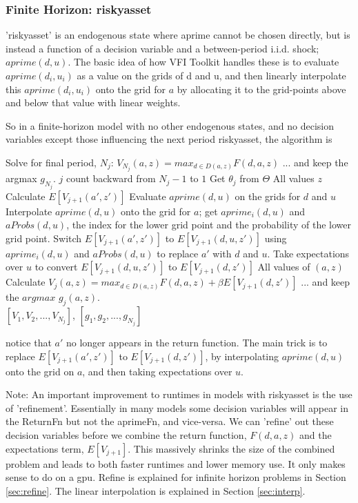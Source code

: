 \subsubsection{Finite Horizon: riskyasset}
'riskyasset' is an endogenous state where aprime cannot be chosen directly, but is instead a function of a decision variable and a between-period i.i.d. shock; $aprime(d,u)$. The basic idea of how VFI Toolkit handles these is to evaluate $aprime(d_i,u_i)$ as a value on the grids of d and u, and then linearly interpolate this $aprime(d_i,u_i)$ onto the grid for $a$ by allocating it to the grid-points above and below that value with linear weights.

So in a finite-horizon model with no other endogenous states, and no decision variables except those influencing the next period riskyasset, the algorithm is
\begin{algorithmic}
 \State Solve for final period, $N_j$: $V_{N_j}(a,z)=max_{d\in D(a,z)} F(d,a,z)$
 \State ... and keep the argmax $g_{N_j}$.
 \For $j$ count backward from $N_j-1$ to $1$
   \State Get $\theta_j$ from $\Theta$
   \For All values $z$
    \State Calculate $E[V_{j+1}(a',z')]$
    \State Evaluate $aprime(d,u)$ on the grids for $d$ and $u$
    \State Interpolate $aprime(d,u)$ onto the grid for $a$; get $aprime_i(d,u)$ and $aProbs(d,u)$, the index for the lower grid point and the probability of the lower grid point.
    \State Switch $E[V_{j+1}(a',z')]$ to $E[V_{j+1}(d,u,z')]$ using $aprime_i(d,u)$ and $aProbs(d,u)$ to replace $a'$ with $d$ and $u$.
    \State Take expectations over $u$ to convert $E[V_{j+1}(d,u,z')]$ to $E[V_{j+1}(d,z')]$
    \For All values of $(a,z)$
     \State Calculate $V_j(a,z)=max_{d \in D(a,z)} F(d,a,z)+\beta E[V_{j+1}(d,z')]$
     \State ... and keep the $argmax$ $g_j(a,z)$.
     \EndFor
   \EndFor
  \EndFor
   \\ \Return $[V_1,V_2,...,V_{N_j}]$, $[g_1,g_2,...,g_{N_j}]$
\end{algorithmic}
notice that $a'$ no longer appears in the return function. The main trick is to replace $E[V_{j+1}(a',z')]$ to $E[V_{j+1}(d,z')]$, by interpolating $aprime(d,u)$ onto the grid on $a$, and then taking expectations over $u$.

Note: An important improvement to runtimes in models with riskyasset is the use of 'refinement'. Essentially in many models some decision variables will appear in the ReturnFn but not the aprimeFn, and vice-versa. We can 'refine' out these decision variables before we combine the return function, $F(d,a,z)$ and the expectations term, $E[V_{j+1}]$. This massively shrinks the size of the combined problem and leads to both faster runtimes and lower memory use. It only makes sense to do on a gpu. Refine is explained for infinite horizon problems in Section \ref{sec:refine}. The linear interpolation is explained in Section \ref{sec:interp}.

